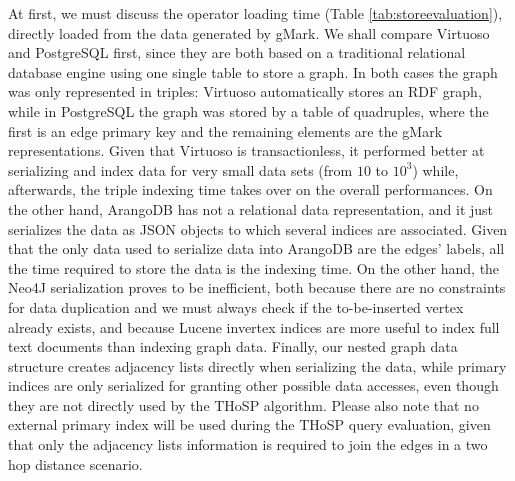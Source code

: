 At first, we must discuss the operator loading time (Table \vref{tab:storeevaluation}), directly loaded from the data generated by gMark. We shall  compare Virtuoso and PostgreSQL first, since they are both based on a traditional relational database engine using one single table to store a graph. In both cases the graph was only represented in triples: Virtuoso automatically stores an RDF graph, while in PostgreSQL the graph was stored by a table of quadruples, where the first is an edge primary key and the remaining elements are the gMark representations. Given that Virtuoso is transactionless, it performed better at serializing and index data for very small data sets (from $10$ to $10^3$) while, afterwards, the triple indexing time takes over on the overall performances. On the other hand, ArangoDB has not a relational data representation, and it just serializes the data as JSON objects to which several indices are associated. Given that the only data used to serialize data into ArangoDB are the edges' labels, all the time required to store the data is the indexing time. On the other hand, the Neo4J serialization proves to be inefficient, both because there are no constraints for data duplication and we must always check if the to-be-inserted vertex already exists, and because Lucene invertex indices are more useful to index full text documents than indexing graph data. Finally, our nested graph data structure creates adjacency lists directly when serializing the data, while primary indices are only serialized for granting other possible data accesses, even though they are not directly used by the THoSP algorithm. Please also note that no external primary index will be used during the THoSP query evaluation, given that only the adjacency lists information is required to join the edges in a two hop distance scenario.

